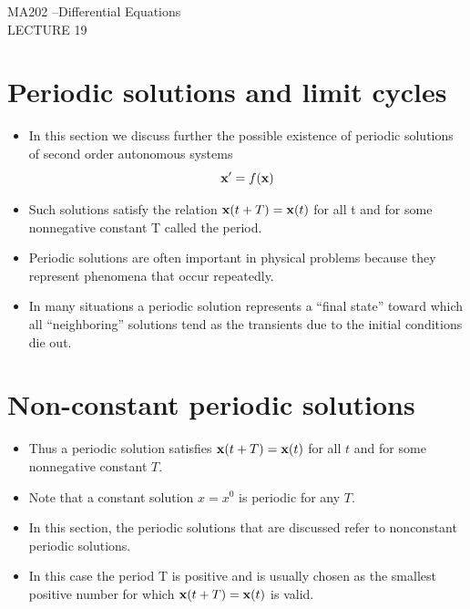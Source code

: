\documentclass[11pt,a4paper]{article}
\begin{document}
	\begin{center}
		\vspace*{8cm}
		\Huge MA202 –Differential Equations\\
		\LARGE LECTURE 19
  \end{center}
  \newpage
	\section*{Periodic solutions and limit cycles}
	\begin{itemize}
		\item In this section we discuss further the possible existence of periodic solutions of second order autonomous systems
		$$
		\vb{x}^\prime = f(\vb{x})
		$$
		\item Such solutions satisfy the relation $\vb{x}(t + T) = \vb{x}(t)$ for all t and for some nonnegative constant T called the period.
		\item Periodic solutions are often important in physical problems because they represent phenomena that occur repeatedly.
		\item In many situations a periodic solution represents a “final state” toward which all “neighboring” solutions tend as the transients due to the initial conditions die out.
	\end{itemize}
	\section*{Non-constant periodic solutions}
	\begin{itemize}
		\item Thus a periodic solution satisfies $\vb{x}(t + T) = \vb{x}(t)$ for all $t$ and for some nonnegative constant $T$.
		\item Note that a constant solution $x = x^0$ is periodic for any $T$.
		\item In this section, the periodic solutions that are discussed refer to nonconstant periodic solutions.
		\item In this case the period T is positive and is usually chosen as the smallest positive number for which $\vb{x}(t + T) = \vb{x}(t)$ is valid.
	\end{itemize}
\end{document}
